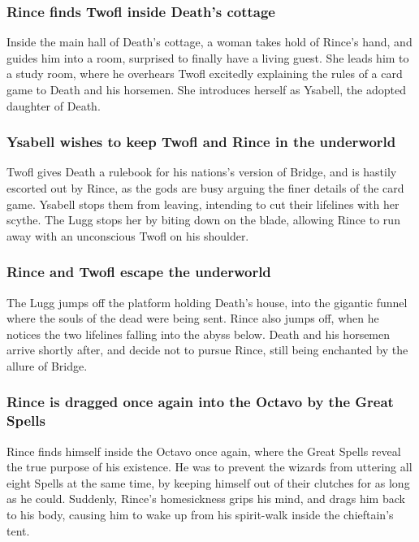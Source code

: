 \subsubsection{\Gls{Rince} finds \Gls{Twofl} inside \Gls{Death}'s cottage}
Inside the main hall of \Gls{Death}'s cottage, a woman takes hold of \Gls{Rince}'s hand, and guides
him into a room, surprised to finally have a living guest. She leads him to a study room, where he
overhears \Gls{Twofl} excitedly explaining the rules of a card game to \Gls{Death} and his horsemen.
She introduces herself as \Gls{Ysabell}, the adopted daughter of \Gls{Death}.

\subsubsection{\Gls{Ysabell} wishes to keep \Gls{Twofl} and \Gls{Rince} in the underworld}
\Gls{Twofl} gives \Gls{Death} a rulebook for his nations's version of Bridge, and is hastily
escorted out by \Gls{Rince}, as the gods are busy arguing the finer details of the card game.
\Gls{Ysabell} stops them from leaving, intending to cut their lifelines with her scythe. The
\Gls{Lugg} stops her by biting down on the blade, allowing \Gls{Rince} to run away with an
unconscious \Gls{Twofl} on his shoulder.

\subsubsection{\Gls{Rince} and \Gls{Twofl} escape the underworld}
The \Gls{Lugg} jumps off the platform holding \Gls{Death}'s house, into the gigantic funnel where
the souls of the dead were being sent. \Gls{Rince} also jumps off, when he notices the two lifelines
falling into the abyss below. \Gls{Death} and his horsemen arrive shortly after, and decide not to
pursue \Gls{Rince}, still being enchanted by the allure of Bridge.

\subsubsection{\Gls{Rince} is dragged once again into the Octavo by the Great Spells}
\Gls{Rince} finds himself inside the Octavo once again, where the Great Spells reveal the true
purpose of his existence. He was to prevent the wizards from uttering all eight Spells at the same
time, by keeping himself out of their clutches for as long as he could. Suddenly, \Gls{Rince}'s
homesickness grips his mind, and drags him back to his body, causing him to wake up from his
spirit-walk inside the chieftain's tent.

